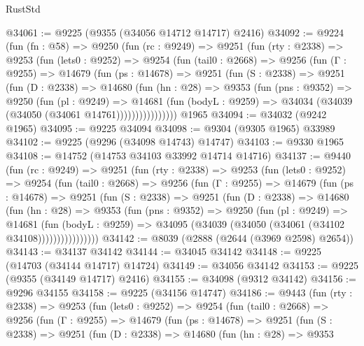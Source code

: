 \begin{lexlean}{RustStd}
\begin{coremodule}
@34061 := @9225 (@9355 (@34056 @14712 @14717) @2416)
@34092 := @9224
    (fun (fn : @58) =>
    @9250
      (fun (rc : @9249) =>
      @9251
        (fun (rty : @2338) =>
        @9253
          (fun (lets0 : @9252) =>
          @9254
            (fun (tail0 : @2668) =>
            @9256
              (fun (Γ : @9255) =>
              @14679
                (fun (ps : @14678) =>
                @9251
                  (fun (S : @2338) =>
                  @9251
                    (fun (D : @2338) =>
                    @14680
                      (fun (hn : @28) =>
                      @9353
                        (fun (pns : @9352) =>
                        @9250
                          (fun (pl : @9249) =>
                          @14681
                            (fun (bodyL : @9259) =>
                            @34034 (@34039 (@34050 (@34061 @14761))))))))))))))))
    @1965
@34094 := @34032 (@9242 @1965)
@34095 := @9225 @34094
@34098 := @9304 (@9305 @1965) @33989
@34102 := @9225 (@9296 (@34098 @14743) @14747)
@34103 := @9330 @1965
@34108 := @14752 (@14753 @34103 @33992 @14714 @14716)
@34137 := @9440
    (fun (rc : @9249) =>
    @9251
      (fun (rty : @2338) =>
      @9253
        (fun (lets0 : @9252) =>
        @9254
          (fun (tail0 : @2668) =>
          @9256
            (fun (Γ : @9255) =>
            @14679
              (fun (ps : @14678) =>
              @9251
                (fun (S : @2338) =>
                @9251
                  (fun (D : @2338) =>
                  @14680
                    (fun (hn : @28) =>
                    @9353
                      (fun (pns : @9352) =>
                      @9250
                        (fun (pl : @9249) =>
                        @14681
                          (fun (bodyL : @9259) =>
                          @34095 (@34039 (@34050 (@34061 (@34102 @34108))))))))))))))))
@34142 := @8039 (@2888 (@2644 (@3969 @2598) @2654))
@34143 := @34137 @34142
@34144 := @34045 @34142
@34148 := @9225 (@14703 (@34144 @14717) @14724)
@34149 := @34056 @34142
@34153 := @9225 (@9355 (@34149 @14717) @2416)
@34155 := @34098 (@9312 @34142)
@34156 := @9296 @34155
@34158 := @9225 (@34156 @14747)
@34186 := @9443
    (fun (rty : @2338) =>
    @9253
      (fun (lets0 : @9252) =>
      @9254
        (fun (tail0 : @2668) =>
        @9256
          (fun (Γ : @9255) =>
          @14679
            (fun (ps : @14678) =>
            @9251
              (fun (S : @2338) =>
              @9251
                (fun (D : @2338) =>
                @14680
                  (fun (hn : @28) =>
                  @9353

\end{coremodule}
\end{lexlean}
